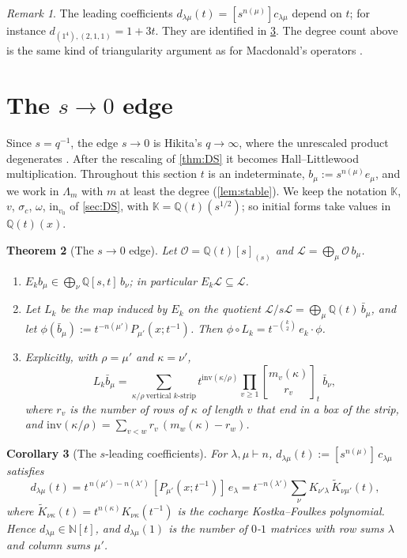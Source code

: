 \documentclass[11pt]{amsart}
\newtheorem{theorem}{Theorem}[section]
\newtheorem{corollary}[theorem]{Corollary}
\theoremstyle{definition}
\theoremstyle{remark}
\newtheorem{remark}[theorem]{Remark}
\numberwithin{equation}{section}
\newcommand{\Lam}{\Lambda}
\newcommand{\qbin}[2]{\genfrac{[}{]}{0pt}{}{#1}{#2}_t}
\begin{document}
\begin{remark}
The leading coefficients $d_{\lambda\mu}(t)=[s^{n(\mu)}]c_{\lambda\mu}$ depend on $t$; for instance $d_{(1^4),(2,1,1)}=1+3t$. They are identified in \cref{cor:dmatrix}. The degree count above is the same kind of triangularity argument as for Macdonald's operators \cite[VI (3.6)--(3.10)]{Macdonald95}.
\end{remark}

\section{The $s\to0$ edge}\label{sec:edge}
Since $s=q^{-1}$, the edge $s\to0$ is Hikita's $q\to\infty$, where the unrescaled product degenerates \cite[Lemma~6.3]{Hikita25}. After the rescaling of \cref{thm:DS} it becomes Hall--Littlewood multiplication. Throughout this section $t$ is an indeterminate, $b_\mu:=s^{n(\mu)}e_\mu$, and we work in $\Lam_m$ with $m$ at least the degree (\cref{lem:stable}). We keep the notation $\mathbb{K}$, $v$, $\sigma_c$, $\omega$, $\mathrm{in}_{v_0}$ of \cref{sec:DS}, with $\mathbb{K}=\mathbb{Q}(t)(s^{1/2})$; so initial forms take values in $\mathbb{Q}(t)(x)$.

\begin{theorem}[The $s\to0$ edge]\label{thm:H}
Let $\mathcal O=\mathbb{Q}(t)[s]_{(s)}$ and $\mathcal L=\bigoplus_\mu\mathcal O\,b_\mu$.
\begin{enumerate}
\item $E_kb_\mu\in\bigoplus_\nu\mathbb{Q}[s,t]\,b_\nu$; in particular $E_k\mathcal L\subseteq\mathcal L$.
\item Let $L_k$ be the map induced by $E_k$ on the quotient $\mathcal L/s\mathcal L=\bigoplus_\mu\mathbb{Q}(t)\,\bar b_\mu$,
and let $\phi(\bar b_\mu):=t^{-n(\mu')}P_{\mu'}(x;t^{-1})$. Then $\phi\circ L_k=t^{-\binom k2}\,e_k\cdot\phi$.
\item Explicitly, with $\rho=\mu'$ and $\kappa=\nu'$,
\[ L_k\bar b_\mu=\sum_{\kappa/\rho\ \text{vertical $k$-strip}}t^{\mathrm{inv}(\kappa/\rho)}\prod_{v\ge1}\qbin{m_v(\kappa)}{r_v}\ \bar b_\nu, \]
where $r_v$ is the number of rows of $\kappa$ of length $v$ that end in a box of the strip, and $\mathrm{inv}(\kappa/\rho)=\sum_{v<w}r_v\,(m_w(\kappa)-r_w)$.
\end{enumerate}
\end{theorem}

\begin{corollary}[The $s$-leading coefficients]\label{cor:dmatrix}
For $\lambda,\mu\vdash n$, $d_{\lambda\mu}(t):=[s^{n(\mu)}]\,c_{\lambda\mu}$ satisfies
\[ d_{\lambda\mu}(t)=t^{\,n(\mu')-n(\lambda')}\,[P_{\mu'}(x;t^{-1})]\,e_\lambda=t^{-n(\lambda')}\sum_\nu K_{\nu'\lambda}\,\widetilde K_{\nu\mu'}(t), \]
where $\widetilde K_{\nu\kappa}(t)=t^{n(\kappa)}K_{\nu\kappa}(t^{-1})$ is the cocharge Kostka--Foulkes polynomial. Hence $d_{\lambda\mu}\in\mathbb{N}[t]$, and $d_{\lambda\mu}(1)$ is the number of $0$-$1$ matrices with row sums $\lambda$ and column sums $\mu'$.
\end{corollary}
\end{document}
